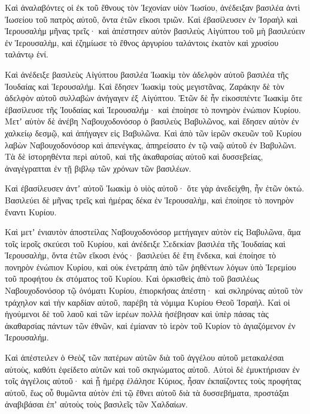 {\par }{\PP {}Καὶ ἀναλαβόντες οἱ ἐκ τοῦ ἔθνους τὸν Ἰεχονίαν υἱὸν Ἰωσίου, ἀνέδειξαν βασιλέα ἀντὶ Ἰωσείου τοῦ πατρὸς αὐτοῦ, ὄντα ἐτῶν εἴκοσι τριῶν.
Καὶ ἐβασίλευσεν ἐν Ἰσραὴλ καὶ Ἱερουσαλὴμ μῆνας τρεῖς· καὶ ἀπέστησεν αὐτὸν βασιλεὺς Αἰγύπτου τοῦ μὴ βασιλεύειν ἐν Ἱερουσαλὴμ,
καὶ ἐζημίωσε τὸ ἔθνος ἀργυρίου ταλάντοις ἑκατὸν καὶ χρυσίου ταλάντῳ ἑνί.
\par }{\PP {}Καὶ ἀνέδειξε βασιλεὺς Αἰγύπτου βασιλέα Ἰωακὶμ τὸν ἀδελφὸν αὐτοῦ βασιλέα τῆς Ἰουδαίας καὶ Ἱερουσαλήμ.
Καὶ ἔδησεν Ἰωακὶμ τοὺς μεγιστᾶνας, Ζαράκην δὲ τὸν ἀδελφὸν αὐτοῦ συλλαβὼν ἀνήγαγεν ἐξ Αἰγύπτου.
Ἐτῶν δὲ ἦν εἰκοσιπέντε Ἰωακὶμ ὅτε ἐβασίλευσε τῆς Ἰουδαίας καὶ Ἱερουσαλήμ· καὶ ἐποίησε τὸ πονηρὸν ἐνώπιον Κυρίου.
Μετʼ αὐτὸν δὲ ἀνέβη Ναβουχοδονόσορ ὁ βασιλεὺς Βαβυλῶνος, καὶ ἔδησεν αὐτὸν ἐν χαλκείῳ δεσμῷ, καὶ ἀπήγαγεν εἰς Βαβυλῶνα.
Καὶ ἀπὸ τῶν ἱερῶν σκευῶν τοῦ Κυρίου λαβὼν Ναβουχοδονόσορ καὶ ἀπενέγκας, ἀπηρείσατο ἐν τῷ ναῷ αὐτοῦ ἐν Βαβυλῶνι.
Τὰ δὲ ἱστορηθέντα περὶ αὐτοῦ, καὶ τῆς ἀκαθαρσίας αὐτοῦ καὶ δυσσεβείας, ἀναγέγραπται ἐν τῇ βιβλῳ τῶν χρόνων τῶν βασιλέων.
\par }{\PP {}Καὶ ἐβασίλευσεν ἀντʼ αὐτοῦ Ἰωακὶμ ὁ υἱὸς αὐτοῦ· ὅτε γὰρ ἀνεδείχθη, ἦν ἐτῶν ὀκτώ.
Βασιλεύει δὲ μῆνας τρεῖς καὶ ἡμέρας δέκα ἐν Ἱερουσαλὴμ, καὶ ἐποίησε τὸ πονηρὸν ἔναντι Κυρίου.
\par }{\PP {}Καὶ μετʼ ἐνιαυτὸν ἀποστείλας Ναβουχοδονόσορ μετήγαγεν αὐτὸν εἰς Βαβυλῶνα, ἅμα τοῖς ἱεροῖς σκεύεσι τοῦ Κυρίου,
καὶ ἀνέδειξε Σεδεκίαν βασιλέα τῆς Ἰουδαίας καὶ Ἱερουσαλὴμ, ὄντα ἐτῶν εἴκοσι ἑνός· βασιλεύει δὲ ἔτη ἕνδεκα,
καὶ ἐποίησε τὸ πονηρὸν ἐνώπιον Κυρίου, καὶ οὐκ ἐνετράπη ἀπὸ τῶν ῥηθέντων λόγων ὑπὸ Ἱερεμίου τοῦ προφήτου ἐκ στόματος τοῦ Κυρίου.
Καὶ ὁρκισθεὶς ἀπὸ τοῦ βασιλέως Ναβουχοδονόσορ τῷ ὀνόματι Κυρίου, ἐπιορκήσας ἀπέστη· καὶ σκληρύνας αὐτοῦ τὸν τράχηλον καὶ τὴν καρδίαν αὐτοῦ, παρέβη τὰ νόμιμα Κυρίου Θεοῦ Ἰσραήλ.
Καὶ οἱ ἡγούμενοι δὲ τοῦ λαοῦ καὶ τῶν ἱερέων πολλὰ ἠσέβησαν καὶ ὑπὲρ πάσας τὰς ἀκαθαρσίας πάντων τῶν ἐθνῶν, καὶ ἐμίαναν τὸ ἱερὸν τοῦ Κυρίον τὸ ἁγιαζόμενον ἐν Ἱερουσαλήμ.
\par }{\PP {}Καὶ ἀπέστειλεν ὁ Θεὸζ τῶν πατέρων αὐτῶν διὰ τοῦ ἀγγέλου αὐτοῦ μετακαλέσαι αὐτοὺς, καθότι ἐφείδετο αὐτῶν καὶ τοῦ σκηνώματος αὐτοῦ.
Αὐτοὶ δὲ ἐμυκτήρισαν ἐν τοῖς ἀγγέλοις αὐτοῦ·
καὶ ᾗ ἡμέρᾳ ἐλάλησε Κύριος, ἦσαν ἐκπαίζοντες τοὺς προφήτας αὐτοῦ, ἕως οὗ θυμῶντα αὐτὸν ἐπὶ τῷ ἔθνει αὐτοῦ διὰ τὰ δυσσεβήματα, προστάξαι ἀναβιβάσαι ἐπʼ αὐτοὺς τοὺς βασιλεῖς τῶν Χαλδαίων.
}
